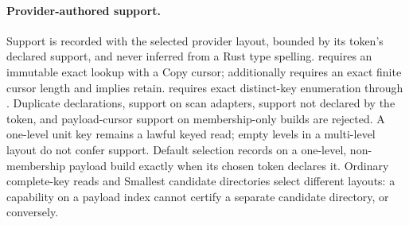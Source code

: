 \paragraph{Provider-authored support.}
Support is recorded with the selected provider layout, bounded by its token's
declared support, and never inferred from a Rust type spelling. 
requires an immutable exact lookup with a Copy
cursor;  additionally requires an exact finite cursor length and
implies retain.  requires exact distinct-key enumeration through
. Duplicate declarations, support on scan adapters, support not
declared by the token, and payload-cursor
support on membership-only builds are rejected. A one-level unit key remains a
lawful keyed read; empty levels in a multi-level layout do not confer support.
Default selection records  on a one-level, non-membership payload
build exactly when its chosen token declares it.
Ordinary complete-key reads and Smallest candidate directories select different
layouts: a capability on a payload index cannot certify a separate candidate
directory, or conversely.

